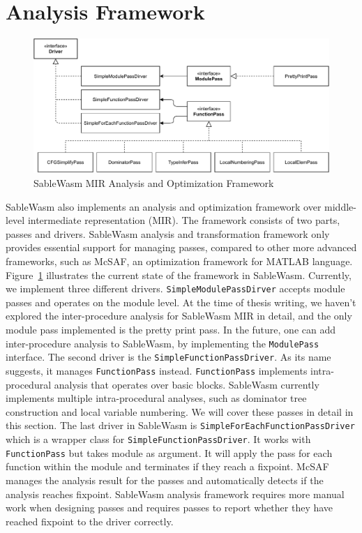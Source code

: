 \section{Analysis Framework}
\begin{figure}
  \centering
  \includegraphics[width=\textwidth]{Images/4.MIR/analysis-framework.pdf}
  \caption{SableWasm MIR Analysis and Optimization Framework}
  \label{fig:sablewasm-mir-analysis-framework}
\end{figure}
SableWasm also implements an analysis and optimization framework over middle-level intermediate representation (MIR). The framework consists of two parts, passes and drivers. SableWasm analysis and transformation framework only provides essential support for managing passes, compared to other more advanced frameworks, such as McSAF\cite{mcsaf}, an optimization framework for MATLAB language. Figure~\ref{fig:sablewasm-mir-analysis-framework} illustrates the current state of the framework in SableWasm. Currently, we implement three different drivers. \texttt{SimpleModulePassDirver} accepts module passes and operates on the module level. At the time of thesis writing, we haven't explored the inter-procedure analysis for SableWasm MIR in detail, and the only module pass implemented is the pretty print pass. In the future, one can add inter-procedure analysis to SableWasm, by implementing the \texttt{ModulePass} interface. The second driver is the \texttt{SimpleFunctionPassDriver}. As its name suggests, it manages \texttt{FunctionPass} instead. \texttt{FunctionPass} implements intra-procedural analysis that operates over basic blocks. SableWasm currently implements multiple intra-procedural analyses, such as dominator tree construction and local variable numbering. We will cover these passes in detail in this section. The last driver in SableWasm is \texttt{SimpleForEachFunctionPassDriver} which is a wrapper class for \texttt{SimpleFunctionPassDriver}. It works with \texttt{FunctionPass} but takes module as argument. It will apply the pass for each function within the module and terminates if they reach a fixpoint. McSAF manages the analysis result for the passes and automatically detects if the analysis reaches fixpoint. SableWasm analysis framework requires more manual work when designing passes and requires passes to report whether they have reached fixpoint to the driver correctly.

